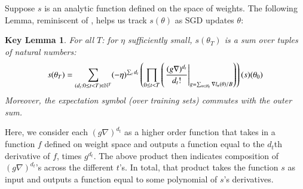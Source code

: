 \documentclass[anon,12pt]{colt2021} %
\newtheorem*{klem*}{Key Lemma}
\newcommand{\wrap}[1]{\left(#1\right)}
\newcommand{\Bb}{\mathcal{B}}
\begin{document}
{        Suppose $s$ is an analytic function defined on the space of weights.
        The following Lemma, reminiscent of \cite{dy49a}, helps us track
        $s(\theta)$ as SGD updates $\theta$:
        \begin{klem*} \label{lem:dyson}
            For all $T$: for $\eta$ sufficiently small, $s(\theta_T)$ is a sum
            over tuples of natural numbers:
            \begin{equation}\label{eq:dyson2}
                s(\theta_T) = 
                \sum_{(d_t: 0\leq t<T) \in \NN^T}
                (-\eta)^{\sum_t d_t}
                \wrap{
                    \prod_{0 \leq t < T}
                        \wrap{\left.
                            \frac{(g \nabla)^{d_t}}{d_t!}
                        \right|_{g = \sum_{n\in \Bb_t} \nabla l_n(\theta) / B}}
                }(s) (\theta_0)
            \end{equation}
            Moreover, the expectation symbol (over training sets) commutes with
            the outer sum.
        \end{klem*}
        Here, we consider each $(g \nabla)^{d_t}$ as a higher order function
        that takes in a function $f$ defined on weight space and outputs a
        function equal to the $d_t$th derivative of $f$, times $g^{d_t}$.
        The above product then indicates composition of $(g \nabla)^{d_t}$'s
        across the different $t$'s.  In total, that product takes the function
        $s$ as input and outputs a function equal to some polynomial of $s$'s
        derivatives.

}
\end{document}
